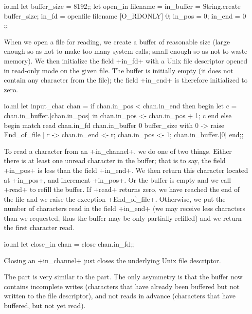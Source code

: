 %
\begin{listingcodefile}{io.ml}
let buffer_size = 8192;;
let open_in filename =
  { in_buffer = String.create buffer_size;
    in_fd = openfile filename [O_RDONLY] 0;
    in_pos = 0;
    in_end = 0 };;
\end{listingcodefile}
%
When we open a file for reading, we create a buffer of reasonable size
(large enough so as not to make too many system calls; small enough so
as not to waste memory). We then initialize the field \ml+in_fd+ with
a Unix file descriptor opened in read-only mode on the given file. The
buffer is initially empty (it does not contain any character from the
file); the field \ml+in_end+ is therefore initialized to zero.
%
\begin{listingcodefile}{io.ml}
let input_char chan =
  if chan.in_pos < chan.in_end then begin
    let c =  chan.in_buffer.[chan.in_pos] in
      chan.in_pos <- chan.in_pos + 1;
      c
  end else begin
    match read chan.in_fd chan.in_buffer 0 buffer_size
    with 0 -> raise End_of_file
       | r -> chan.in_end <- r;
              chan.in_pos <- 1;
              chan.in_buffer.[0]
  end;;
\end{listingcodefile}
% 
To read a character from an \ml+in_channel+, we do one of two
things.  Either there is at least one unread character in the buffer;
that is to say, the field \ml+in_pos+ is less than the field
\ml+in_end+. We then return this character located at \ml+in_pos+, and
increment \ml+in_pos+. Or the buffer is empty and we call \ml+read+ to
refill the buffer. If \ml+read+ returns zero, we have reached the end
of the file and we raise the exception \ml+End_of_file+. Otherwise, we
put the number of characters read in the field \ml+in_end+ (we may
receive less characters than we requested, thus the buffer may be
only partially refilled) and we return the first character read.
%
\begin{listingcodefile}{io.ml}
let close_in chan =
  close chan.in_fd;;
\end{listingcodefile}
%
Closing an \ml+in_channel+ just closes the underlying Unix file descriptor. 

The  part is very similar to the 
part. The only asymmetry is that the buffer now contains incomplete
writes (characters that have already been buffered but not written to
the file descriptor), and not reads in advance (characters that have
buffered, but not yet read).

